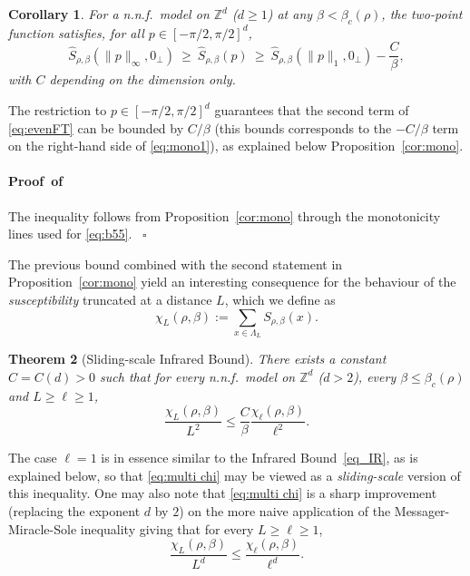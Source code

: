 \documentclass[a4paper,oneside,11pt]{article}
\def\Z{\mathbb{Z}}                          %
\newtheorem{theorem}{Theorem}[section]
\newtheorem{corollary}[theorem]{Corollary}
\newcommand{\be}[1]{\begin{equation}\label{#1}}
\newcommand{\ee}{\end{equation}}
\numberwithin{equation}{section}
\numberwithin{equation}{section}
\numberwithin{equation}{section}
\newenvironment{proof}[1][\relax]%
  {\paragraph{Proof\ifx#1\relax\else~of #1\fi}}%
  {~\hfill$\square$\par\bigskip}
\def\Z{\mathbb{Z}}                          %
\def\be{\begin{equation}}
\def\ee{\end{equation}}
\begin{document}
\begin{corollary} \label{cor:monotonicity FT}
For {a n.n.f.~model} on $\Z^d$ ($d\ge1$) at any $\beta<\beta_c(\rho)$, the two-point function satisfies, for all $p \in [-\pi/2, \pi/2]^d$,  
\be \label{eq:mono1}
\widehat S_{\rho,\beta}(   \|p\|_\infty, 0_\perp)    \  \geq  \ \widehat S_{\rho,\beta}(p)\  \geq \ \widehat S_{\rho,\beta}( \|p\|_1, 0_\perp)   - \frac{C}{\beta},
\ee
with $C$ depending on the dimension only.
\end{corollary} 

The restriction to $p\in[-\pi/2,\pi/2]^d$ guarantees that the second term of \eqref{eq:evenFT} can be bounded by $C/\beta$ (this bounds corresponds to the $-C/\beta$ term on the right-hand side of \eqref{eq:mono1}), as explained below Proposition~\ref{cor:mono}.
\begin{proof} 
The inequality follows from  Proposition~\ref{cor:mono} through the monotonicity lines used for \eqref{eq:b55}.  
\end{proof} 
The previous bound combined with the second statement in  
Proposition~\ref{cor:mono} yield an interesting consequence for  the  behaviour of the {\em susceptibility} truncated at a distance $L$, which we define as 
 \be
 \chi_L(\rho,\beta):=\sum_{x\in\Lambda_L}S_{\rho,\beta}(x).
 \ee
\begin{theorem}[Sliding-scale Infrared Bound]\label{prop_mon_chi}
There exists a constant $C=C(d)>0$ such that for {every n.n.f.~model} on $\Z^d$ ($d>2$), every $\beta\le \beta_c(\rho)$ and $L\ge \ell\ge 1$,
\be\label{eq:multi chi}
\frac{\chi_L(\rho,\beta)}{L^2}\le \frac{C}{\beta}\frac{\chi_\ell(\rho,\beta)}{\ell^2}.
\ee
\end{theorem}

The case $\ell=1$ is in essence similar to the Infrared Bound~\eqref{eq_IR}, as is explained below, so that \eqref{eq:multi chi} may be viewed as a \emph{sliding-scale}  version of this inequality.   One may also note that \eqref{eq:multi chi}  is a sharp improvement (replacing the exponent $d$ by $2$) on the more naive application of the Messager-Miracle-Sole inequality  giving that for every $L\ge \ell\ge1$,
\be\label{eq:comparison chi}
\frac{\chi_L(\rho,\beta)}{L^d}\le \frac{\chi_\ell(\rho,\beta)}{\ell^d}.
\ee
\end{document}
